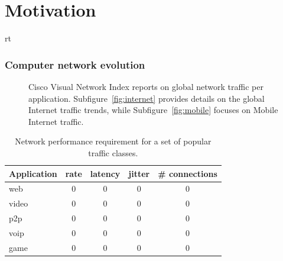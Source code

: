 \section{Motivation} \label{sec:intro:motivations}
rt 

\subsubsection*{Computer network evolution}

\begin{figure}[ht] \centering {}
  \caption{Cisco Visual Network Index reports on global network traffic per
    application. Subfigure~\ref{fig:internet} provides details on the global
    Internet traffic trends, while Subfigure~\ref{fig:mobile} focuses on Mobile
    Internet traffic.} \label{fig:internet_applications} \end{figure}


\begin{table} \begin{center} \begin{tabular}{ | l | c c c c | } \hline
      Application  & rate & latency & jitter  & \# connections \\ \hline web
      & 0    & 0       & 0      & 0\\ video        & 0    & 0       & 0      &
      0\\ p2p          & 0    & 0       & 0      & 0\\ voip         & 0    & 0
      & 0      & 0\\ game         & 0    & 0       & 0      & 0\\ \hline
    \end{tabular} \end{center} \caption{Network performance requirement for a
    set of popular traffic classes.} \label{tbl:application_requirement}
\end{table}

